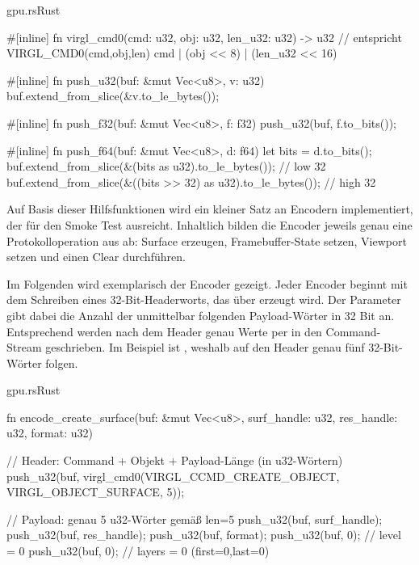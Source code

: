 \begin{codeblock}{gpu.rs}{Rust}
  \begin{rustcode}
#[inline]
fn virgl_cmd0(cmd: u32, obj: u32, len_u32: u32) -> u32 {
    // entspricht VIRGL_CMD0(cmd,obj,len)
    cmd | (obj << 8) | (len_u32 << 16)
}

#[inline]
fn push_u32(buf: &mut Vec<u8>, v: u32) { buf.extend_from_slice(&v.to_le_bytes()); }

#[inline]
fn push_f32(buf: &mut Vec<u8>, f: f32) { push_u32(buf, f.to_bits()); }

#[inline]
fn push_f64(buf: &mut Vec<u8>, d: f64) {
    let bits = d.to_bits();
    buf.extend_from_slice(&(bits as u32).to_le_bytes());         // low  32
    buf.extend_from_slice(&((bits >> 32) as u32).to_le_bytes()); // high 32
}
  \end{rustcode}
\end{codeblock}

Auf Basis dieser Hilfsfunktionen wird ein kleiner Satz an Encodern implementiert, der für den Smoke Test ausreicht. Inhaltlich bilden die Encoder jeweils genau eine Protokolloperation aus  ab: Surface erzeugen, Framebuffer-State setzen, Viewport setzen und einen Clear durchführen.

Im Folgenden wird exemplarisch der Encoder  gezeigt. Jeder Encoder beginnt mit dem Schreiben eines 32-Bit-Headerworts, das über  erzeugt wird. Der Parameter  gibt dabei die Anzahl der unmittelbar folgenden Payload-Wörter in 32 Bit an. Entsprechend werden nach dem Header genau  Werte per  in den Command-Stream geschrieben. Im Beispiel ist , weshalb auf den Header genau fünf 32-Bit-Wörter folgen.

\begin{codeblock}{gpu.rs}{Rust}
  \begin{rustcode}
fn encode_create_surface(buf: &mut Vec<u8>, surf_handle: u32, res_handle: u32, format: u32) {
    // Header: Command + Objekt + Payload-Länge (in u32-Wörtern)
    push_u32(buf, virgl_cmd0(VIRGL_CCMD_CREATE_OBJECT, VIRGL_OBJECT_SURFACE, 5));

    // Payload: genau 5 u32-Wörter gemäß len=5
    push_u32(buf, surf_handle);
    push_u32(buf, res_handle);
    push_u32(buf, format);
    push_u32(buf, 0); // level = 0
    push_u32(buf, 0); // layers = 0 (first=0,last=0)
}
  \end{rustcode}
\end{codeblock}

